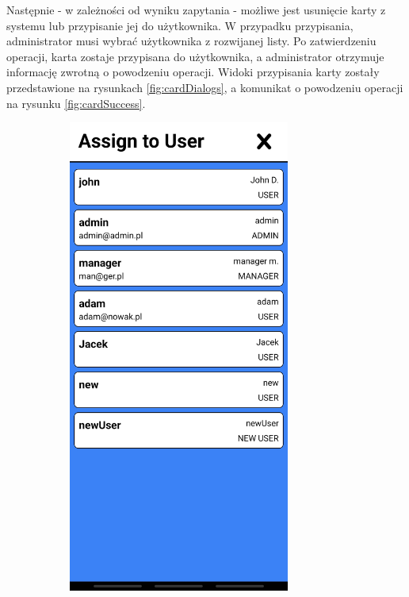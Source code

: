 Następnie - w zależności od wyniku zapytania - możliwe jest usunięcie karty z systemu lub przypisanie jej do użytkownika. W przypadku przypisania, administrator musi wybrać użytkownika z rozwijanej listy. Po zatwierdzeniu operacji, karta zostaje przypisana do użytkownika, a administrator otrzymuje informację zwrotną o powodzeniu operacji. Widoki przypisania karty zostały przedstawione na rysunkach \ref{fig:cardDialogs}, a komunikat o powodzeniu operacji na rysunku \ref{fig:cardSuccess}.

\begin{figure}
    \centering
    \begin{subfigure}[b]{0.3\textwidth}
        \centering
        \includegraphics[width=0.8\textwidth, frame]{graf/mobile/userList.jpg}

\end{subfigure}
\end{figure}
